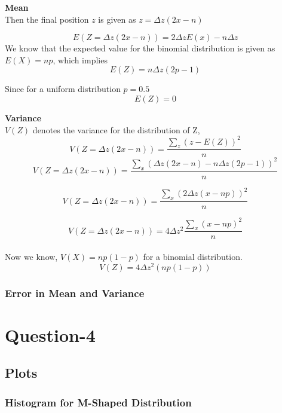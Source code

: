 \documentclass[a4paper]{article}
\begin{document}
{\textbf{Mean}}\\
Then the final position $z$ is given as $z=\Delta z(2x-n)$

$$E(Z = \Delta z(2x-n)) = 2\Delta z E(x) - n\Delta z$$
We know that the expected value for the binomial distribution is given as $E(X) = np$, which implies
$$ E(Z) = n\Delta z(2p-1)$$

Since for a uniform distribution $p=0.5$
$$E(Z) = 0$$

{\textbf{Variance}}\\
$V(Z)$ denotes the variance for the distribution of Z,\\
$$V(Z=\Delta z(2x-n)) = \frac{\sum_{z} \left(z - E(Z)\right)^{2}}{n}$$
$$V(Z=\Delta z(2x-n)) = \frac{\sum_{x} \left(\Delta z(2x-n) - n\Delta z(2p-1) \right)^{2}}{n}$$

$$V(Z=\Delta z(2x-n)) = \frac{\sum_{x} \left(2\Delta z(x-np)\right)^{2}}{n}$$

$$V(Z=\Delta z(2x-n)) = 4\Delta z^{2} \frac{\sum_{x} \left(x-np\right)^{2}}{n}$$\\


Now we know, $V(X) = np(1-p)$ for a binomial distribution.
$$V(Z)=4\Delta z^{2}(np(1-p))$$

\subsubsection{Error in Mean and Variance}
\vspace{1em}

\clearpage

\section{Question-4}
\subsection{Plots}

\subsubsection{Histogram for M-Shaped Distribution}
\begin{figure}[H]
	\centering
	\begin{floatrow}
	\end{floatrow}
\end{figure}
\end{document}
